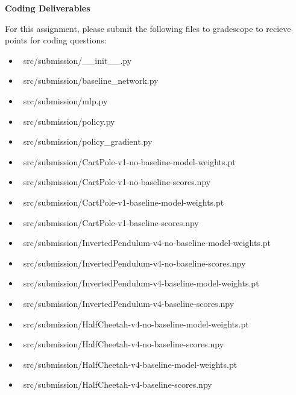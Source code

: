\textbf{Coding Deliverables}

For this assignment, please submit the following files to gradescope to recieve points for coding questions:
\begin{itemize}
    \item ~src/submission/__init__.py~
    \item ~src/submission/baseline_network.py~
    \item ~src/submission/mlp.py~
    \item ~src/submission/policy.py~
    \item ~src/submission/policy_gradient.py~
    \item ~src/submission/CartPole-v1-no-baseline-model-weights.pt~
    \item ~src/submission/CartPole-v1-no-baseline-scores.npy~
    \item ~src/submission/CartPole-v1-baseline-model-weights.pt~
    \item ~src/submission/CartPole-v1-baseline-scores.npy~
    \item ~src/submission/InvertedPendulum-v4-no-baseline-model-weights.pt~
    \item ~src/submission/InvertedPendulum-v4-no-baseline-scores.npy~
    \item ~src/submission/InvertedPendulum-v4-baseline-model-weights.pt~
    \item ~src/submission/InvertedPendulum-v4-baseline-scores.npy~
    \item ~src/submission/HalfCheetah-v4-no-baseline-model-weights.pt~
    \item ~src/submission/HalfCheetah-v4-no-baseline-scores.npy~
    \item ~src/submission/HalfCheetah-v4-baseline-model-weights.pt~
    \item ~src/submission/HalfCheetah-v4-baseline-scores.npy~ \\
\end{itemize}  

\clearpage
